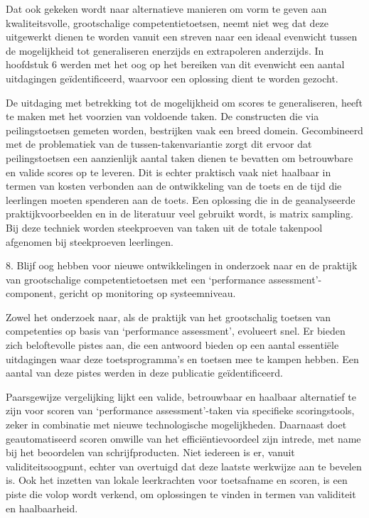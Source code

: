 \documentclass[
  letterpaper,
]{report}
\begin{document}
Dat ook gekeken wordt naar alternatieve manieren om vorm te geven aan
kwaliteitsvolle, grootschalige competentietoetsen, neemt niet weg dat
deze uitgewerkt dienen te worden vanuit een streven naar een ideaal
evenwicht tussen de mogelijkheid tot generaliseren enerzijds en
extrapoleren anderzijds. In hoofdstuk 6 werden met het oog op het
bereiken van dit evenwicht een aantal uitdagingen geïdentificeerd,
waarvoor een oplossing dient te worden gezocht.

De uitdaging met betrekking tot de mogelijkheid om scores te
generaliseren, heeft te maken met het voorzien van voldoende taken. De
constructen die via peilingstoetsen gemeten worden, bestrijken vaak een
breed domein. Gecombineerd met de problematiek van de
tussen-takenvariantie zorgt dit ervoor dat peilingstoetsen een
aanzienlijk aantal taken dienen te bevatten om betrouwbare en valide
scores op te leveren. Dit is echter praktisch vaak niet haalbaar in
termen van kosten verbonden aan de ontwikkeling van de toets en de tijd
die leerlingen moeten spenderen aan de toets. Een oplossing die in de
geanalyseerde praktijkvoorbeelden en in de literatuur veel gebruikt
wordt, is matrix sampling. Bij deze techniek worden steekproeven van
taken uit de totale takenpool afgenomen bij steekproeven leerlingen.

{ 8. Blijf oog hebben voor nieuwe ontwikkelingen in onderzoek naar en de
praktijk van grootschalige competentietoetsen met een `performance
assessment'-component, gericht op monitoring op systeemniveau. }

Zowel het onderzoek naar, als de praktijk van het grootschalig toetsen
van competenties op basis van `performance assessment', evolueert snel.
Er bieden zich beloftevolle pistes aan, die een antwoord bieden op een
aantal essentiële uitdagingen waar deze toetsprogramma's en toetsen mee
te kampen hebben. Een aantal van deze pistes werden in deze publicatie
geïdentificeerd.

Paarsgewijze vergelijking lijkt een valide, betrouwbaar en haalbaar
alternatief te zijn voor scoren van `performance assessment'-taken via
specifieke scoringstools, zeker in combinatie met nieuwe technologische
mogelijkheden. Daarnaast doet geautomatiseerd scoren omwille van het
efficiëntievoordeel zijn intrede, met name bij het beoordelen van
schrijfproducten. Niet iedereen is er, vanuit validiteitsoogpunt, echter
van overtuigd dat deze laatste werkwijze aan te bevelen is. Ook het
inzetten van lokale leerkrachten voor toetsafname en scoren, is een
piste die volop wordt verkend, om oplossingen te vinden in termen van
validiteit en haalbaarheid.
\end{document}
